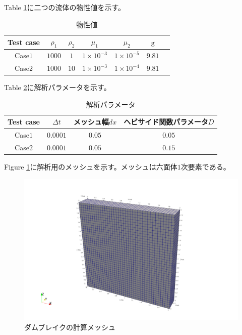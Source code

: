 \documentclass[8pt,a4paper]{article}
\begin{document}
Table \ref{table:dambreak-material-property}に二つの流体の物性値を示す。
\renewcommand{\arraystretch}{1}
\begin{table}[H]
	\centering
	\caption{物性値}
	\begin{tabular}{ccccccc}
		\hline
		Test case & $\rho_1$ & $\rho_2$ & $\mu_1$ & $\mu_2$ & $\mathrm{g}$ \\
		\hline 
		Case$1$ & $1000$ & $1$   & $1\times10^{-3}$ & $1\times10^{-5}$ & $9.81$ \\
		Case$2$ & $1000$ & $10$  & $1\times10^{-3}$ & $1\times10^{-4}$ & $9.81$ \\
		\hline         
	\end{tabular}
	\label{table:dambreak-material-property}
\end{table}
\renewcommand{\arraystretch}{1.0}

Table \ref{table:dambreak-parameter}に解析パラメータを示す。
\renewcommand{\arraystretch}{1}
\begin{table}[H]
	\centering
	\caption{解析パラメータ}
	\begin{tabular}{cccc}
		\hline
		Test case & $\Delta t$ & メッシュ幅$dx$ & ヘビサイド関数パラメータ$D$\\
		\hline 
		Case$1$ & $0.0001$ & $0.05$ & $0.05$\\
		Case$2$ & $0.0001$ & $0.05$ & $0.15$\\
		\hline         
	\end{tabular}
	\label{table:dambreak-parameter}
\end{table}
\renewcommand{\arraystretch}{1.0}

Figure \ref{fig:3d-dambreak-mesh}に解析用のメッシュを示す。メッシュは六面体$1$次要素である。
\begin{figure}[H]
	\centering
	\includegraphics[width=18truecm]{pics/3d-dambreak/mesh.pdf}
	\caption{ダムブレイクの計算メッシュ}
	\label{fig:3d-dambreak-mesh}
\end{figure}
\end{document}
